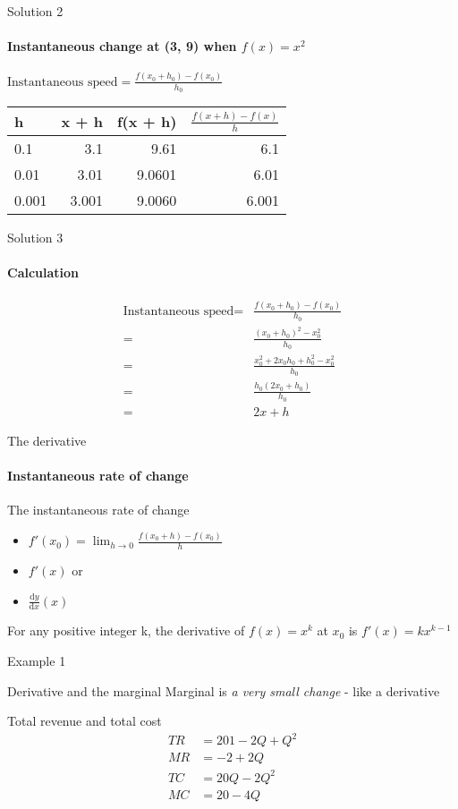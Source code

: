 \documentclass[14pt,xcolor=pdftex,dvipsnames,table]{beamer}
\begin{document}
\begin{frame}{Solution 2}
\framesubtitle{Instantaneous change at (3, 9) when $f(x) = x^2$}
$\text{Instantaneous speed} = \frac{f(x_0 + h_0) - f(x_0)}{h_0}$
\vskip 0.25cm
\begin{center}
\begin{tabular}{l r r r}
h & x + h & f(x + h) & $\frac{f(x +h) - f(x)}{h}$\\
\hline
0.1 & 3.1 & 9.61 & 6.1 \\
0.01 & 3.01 & 9.0601 & 6.01 \\
0.001 & 3.001 & 9.0060 & 6.001\\
\end{tabular}
\end{center}
\end{frame}

\begin{frame}{Solution 3}
\framesubtitle{Calculation}
\begin{align*}
\text{Instantaneous speed} = &\frac{f(x_0 + h_0) - f(x_0)}{h_0}\\
 = & \frac{(x_0 + h_0)^2 - x_0^2}{h_0}\\
 = & \frac{x_0^2 +2x_0h_0 + h_0^2 - x_0^2}{h_0}\\
 = & \frac{h_0(2x_0 + h_0)}{h_0}\\
 = & 2x + h
 \end{align*}
 \end{frame}
 
 \begin{frame}{The derivative}
 \framesubtitle{Instantaneous rate of change}
 The instantaneous rate of change 
 \pause
  \begin{itemize}[<+-| alert@+>]
 \item $f'(x_0) = \lim_{h \to 0} \frac{f(x_0 +h) - f(x_0)}{h}$
 \item $f'(x)$
 or
 \item $\frac{\mathrm d y}{\mathrm d x}(x)$
 \end{itemize}
 \pause
 \begin{block}{}
For any positive integer k, the derivative of $f(x) = x^k$ at $x_0$ is $f'(x) = kx^{k-1}$
\end{block}
\end{frame}

\begin{frame}{Example 1}
\begin{block}{Derivative and the marginal}
Marginal is \emph{a very small change} - like a derivative
\end{block}
\pause
\begin{block}{Total revenue and total cost}
\begin{align*}
TR &= 201 -2Q + Q^2\\
MR &= -2 + 2Q\\
TC &= 20Q -2Q^2\\
MC &= 20 -4Q
\end{align*}
\end{block}
\end{frame}
\end{document}
